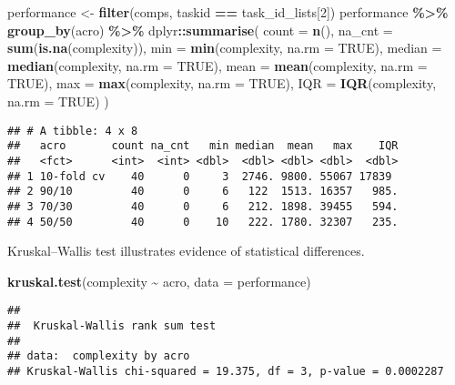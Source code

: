 \documentclass[
]{book}
\newenvironment{Shaded}{\begin{snugshade}}{\end{snugshade}}
\newcommand{\AttributeTok}[1]{\textcolor[rgb]{0.13,0.29,0.53}{#1}}
\newcommand{\ConstantTok}[1]{\textcolor[rgb]{0.56,0.35,0.01}{#1}}
\newcommand{\DecValTok}[1]{\textcolor[rgb]{0.00,0.00,0.81}{#1}}
\newcommand{\FunctionTok}[1]{\textcolor[rgb]{0.13,0.29,0.53}{\textbf{#1}}}
\newcommand{\NormalTok}[1]{#1}
\newcommand{\OtherTok}[1]{\textcolor[rgb]{0.56,0.35,0.01}{#1}}
\newcommand{\SpecialCharTok}[1]{\textcolor[rgb]{0.81,0.36,0.00}{\textbf{#1}}}
\begin{document}
\begin{Shaded}
\begin{Highlighting}[]
\NormalTok{performance }\OtherTok{\textless{}{-}} \FunctionTok{filter}\NormalTok{(comps, taskid }\SpecialCharTok{==}\NormalTok{ task\_id\_lists[}\DecValTok{2}\NormalTok{])}
\NormalTok{performance }\SpecialCharTok{\%\textgreater{}\%}
  \FunctionTok{group\_by}\NormalTok{(acro) }\SpecialCharTok{\%\textgreater{}\%}
\NormalTok{  dplyr}\SpecialCharTok{::}\FunctionTok{summarise}\NormalTok{(}
    \AttributeTok{count =} \FunctionTok{n}\NormalTok{(),}
    \AttributeTok{na\_cnt =} \FunctionTok{sum}\NormalTok{(}\FunctionTok{is.na}\NormalTok{(complexity)),}
    \AttributeTok{min =} \FunctionTok{min}\NormalTok{(complexity, }\AttributeTok{na.rm =} \ConstantTok{TRUE}\NormalTok{),}
    \AttributeTok{median =} \FunctionTok{median}\NormalTok{(complexity, }\AttributeTok{na.rm =} \ConstantTok{TRUE}\NormalTok{),}
    \AttributeTok{mean =} \FunctionTok{mean}\NormalTok{(complexity, }\AttributeTok{na.rm =} \ConstantTok{TRUE}\NormalTok{),}
    \AttributeTok{max =} \FunctionTok{max}\NormalTok{(complexity, }\AttributeTok{na.rm =} \ConstantTok{TRUE}\NormalTok{),}
    \AttributeTok{IQR =} \FunctionTok{IQR}\NormalTok{(complexity, }\AttributeTok{na.rm =} \ConstantTok{TRUE}\NormalTok{)}
\NormalTok{  )}
\end{Highlighting}
\end{Shaded}

\begin{verbatim}
## # A tibble: 4 x 8
##   acro       count na_cnt   min median  mean   max    IQR
##   <fct>      <int>  <int> <dbl>  <dbl> <dbl> <dbl>  <dbl>
## 1 10-fold cv    40      0     3  2746. 9800. 55067 17839 
## 2 90/10         40      0     6   122  1513. 16357   985.
## 3 70/30         40      0     6   212. 1898. 39455   594.
## 4 50/50         40      0    10   222. 1780. 32307   235.
\end{verbatim}

Kruskal--Wallis test illustrates evidence of statistical differences.

\begin{Shaded}
\begin{Highlighting}[]
\FunctionTok{kruskal.test}\NormalTok{(complexity }\SpecialCharTok{\textasciitilde{}}\NormalTok{ acro, }\AttributeTok{data =}\NormalTok{ performance)}
\end{Highlighting}
\end{Shaded}

\begin{verbatim}
## 
##  Kruskal-Wallis rank sum test
## 
## data:  complexity by acro
## Kruskal-Wallis chi-squared = 19.375, df = 3, p-value = 0.0002287
\end{verbatim}
\end{document}
